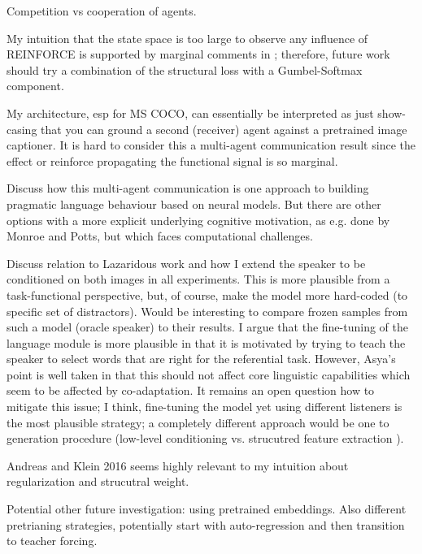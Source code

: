 
Competition vs cooperation of agents. 

My intuition that the state space is too large to observe any influence of REINFORCE is supported by marginal comments in \cite{havrylov2017emergence}; therefore, future work should try a combination of the structural loss with a Gumbel-Softmax component.

My architecture, esp for MS COCO, can essentially be interpreted as just show-casing that you can ground a second (receiver) agent against a pretrained image captioner. It is hard to consider this a multi-agent communication result since the effect or reinforce propagating the functional signal is so marginal. 

Discuss how this multi-agent communication is one approach to building pragmatic language behaviour based on neural models. But there are other options with a more explicit underlying cognitive motivation, as e.g. done by Monroe and Potts, but which faces computational challenges. 

Discuss relation to Lazaridous work and how I extend the speaker to be conditioned on both images in all experiments. This is more plausible from a task-functional perspective, but, of course, make the model more hard-coded (to specific set of distractors). Would be interesting to compare frozen samples from such a model (oracle speaker) to their results. I argue that the fine-tuning of the language module is more plausible in that it is motivated by trying to teach the speaker to select words that are right for the referential task. However, Asya's point is well taken in that this should not affect core linguistic capabilities which seem to be affected by co-adaptation. It remains an open question how to mitigate this issue; I think, fine-tuning the model yet using different listeners is the most plausible strategy; a completely different approach would be one to generation procedure (low-level conditioning vs. strucutred feature extraction ). 

Andreas and Klein 2016 seems highly relevant to my intuition about regularization and strucutral weight. 

Potential other future investigation: using pretrained embeddings.
Also different pretrianing strategies, potentially start with auto-regression and then transition to teacher forcing. 